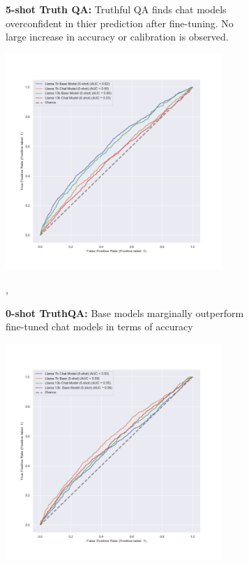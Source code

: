 \documentclass[11pt]{article}
\begin{document}
\begin{figure}
\begin{subfigure}[b]{0.49\textwidth}
         \caption{\textbf{5-shot Truth QA:} Truthful QA finds chat models overconfident in thier prediction after fine-tuning. No large increase in accuracy or calibration is observed.}
         \label{fig:5-shot-truthfulqa}
     \end{subfigure}    
     
     \hfill
         \begin{subfigure}[b]{0.49\textwidth}
             \centering \includegraphics[width=0.9\textwidth]{figures/0-shot-truthful_qa-roc-roc.png}
             \caption{\textbf{0-shot TruthQA:} Base models marginally outperform fine-tuned chat models 
             in terms of accuracy},
             \label{fig:0-shot-MMLU}
        \end{subfigure} 
         \begin{subfigure}[b]{0.49\textwidth}
             \centering \includegraphics[width=0.9\textwidth]{figures/5-shot-TruthfulQA-roc.png}

\end{subfigure}
\end{figure}
\end{document}
